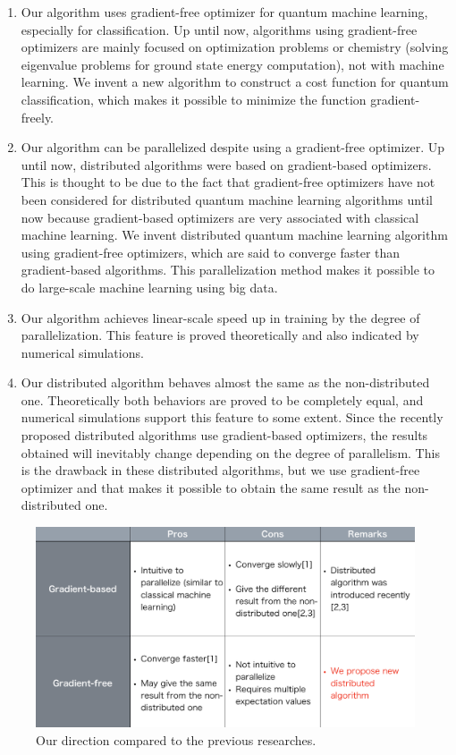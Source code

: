 \begin{enumerate}
\item Our algorithm uses gradient-free optimizer for quantum machine learning, especially for classification. Up until now, algorithms using gradient-free optimizers are mainly focused on optimization problems or chemistry (solving eigenvalue problems for ground state energy computation), not with machine learning. We invent a new algorithm to construct a cost function for quantum classification, which makes it possible to minimize the function gradient-freely.

\item Our algorithm can be parallelized despite using a gradient-free optimizer. Up until now, distributed algorithms were based on gradient-based optimizers\cite{Qi_2022, 9775600}. This is thought to be due to the fact that gradient-free optimizers have not been considered for distributed quantum machine learning algorithms until now because gradient-based optimizers are very associated with classical machine learning. We invent distributed quantum machine learning algorithm using gradient-free optimizers, which are said to converge faster than gradient-based algorithms. This parallelization method makes it possible to do large-scale machine learning using big data.

\item Our algorithm achieves linear-scale speed up in training by the degree of parallelization. This feature is proved theoretically and also indicated by numerical simulations.

\item Our distributed algorithm behaves almost the same as the non-distributed one. Theoretically both behaviors are proved to be completely equal, and numerical simulations support this feature to some extent. Since the recently proposed distributed algorithms use gradient-based optimizers, the results obtained will inevitably change depending on the degree of parallelism. This is the drawback in these distributed algorithms, but we use gradient-free optimizer and that makes it possible to obtain the same result as the non-distributed one.
 \end{enumerate}

\begin{figure}[htb]
    \centering
    \includegraphics[keepaspectratio, scale=0.5]{introduction/optimizer.png}
    \caption{Our direction compared to the previous researches.}
    \label{fig:optimizer}
\end{figure}